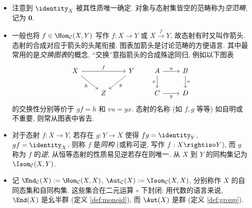 \begin{itemize}
	\item 注意到 $\identity_X$ 被其性质唯一确定. 对象与态射集皆空的范畴称为\emph{空范畴}, 记为 $\mathbf{0}$.
	\item 一般也将 $f \in \Hom_{\mathcal{C}}(X, Y)$ 写作 $f: X \to Y$ 或 $X \xrightarrow{f} Y$, 故态射有时又叫作箭头. 态射的合成对应于箭头的头尾衔接. 图表加箭头是讨论范畴的方便语言. 其中最常用的是\emph{交换图表}的概念, ``交换''意指箭头的合成殊途同归, 例如以下图表
	\[ \begin{tikzcd}
		X \arrow[rr, "f"] \arrow[rd, "h"'] & & Y \arrow[ld, "g"] \\
		& Z &
	\end{tikzcd} \qquad \begin{tikzcd}
		A \arrow[r, "u"] \arrow[d, "x"'] & B \arrow[d, "v"] \\
		C \arrow[r, "y"'] & D
	\end{tikzcd} \]
	的交换性分别等价于 $g f = h$ 和 $v u = y x$. 态射的名称 (如 $f,g$ 等等) 如自明或不重要, 则常从图表中省去.

	\item 对于态射 $f: X \to Y$, 若存在 $g: Y \to X$ 使得 $f g = \identity_Y$, $g f = \identity_X$, 则称 $f$ 是\emph{同构} (或称可逆, 写作 $f: X \rightiso Y$), 而 $g$ 称为 $f$ 的\emph{逆}, 从恒等态射的性质易见逆若存在则唯一. 从 $X$ 到 $Y$ 的同构集记为 $\Isom_{\mathcal{C}}(X, Y)$. 

	\item 记 $\End_{\mathcal{C}}(X) := \Hom_{\mathcal{C}}(X, X)$, $\Aut_{\mathcal{C}}(X) := \Isom_{\mathcal{C}}(X, X)$, 分别称作 $X$ 的自同态集和自同构集. 这些集合在二元运算 $\circ$ 下封闭: 用代数的语言来说, $\End(X)$ 是幺半群 (定义 \ref{def:monoid}), 而 $\Aut(X)$ 是群 (定义 \ref{def:group}).
\end{itemize}

